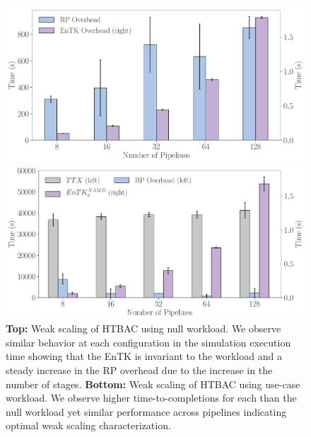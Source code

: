 

\begin{figure}[!htbp]
  \centering
  \begin{minipage}[b]{0.49\textwidth}
  \centering
  \includegraphics[width=\textwidth]{FIGURES/null_workload_overheads.pdf}
  \end{minipage}
  \begin{minipage}[b]{0.49\textwidth}
  \centering
  \includegraphics[width=\textwidth]{FIGURES/namd_workload_overheads.pdf}
  \end{minipage}
  \caption{\textbf{Top:} Weak scaling of HTBAC using null workload. We
          observe similar behavior at each configuration in the simulation
          execution time showing that the EnTK is invariant to the
          workload and a steady increase in the RP overhead due to the
          increase in the number of stages. \textbf{Bottom:} Weak scaling of
          HTBAC using use-case workload. We observe higher time-to-completions for each  than the null workload yet similar performance across pipelines indicating optimal weak scaling characterization.}\label{fig:htbac_perf}
\end{figure}


